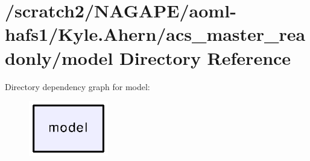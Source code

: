 \section{/scratch2/\-N\-A\-G\-A\-P\-E/aoml-\/hafs1/\-Kyle.Ahern/acs\-\_\-master\-\_\-readonly/model Directory Reference}
\label{dir_3f14f6767c31cb4a1d22c13c18cc6fc3}
Directory dependency graph for model\-:
\nopagebreak
\begin{figure}[H]
\begin{center}
\leavevmode
\includegraphics[width=98pt]{dir_3f14f6767c31cb4a1d22c13c18cc6fc3_dep}
\end{center}
\end{figure}
